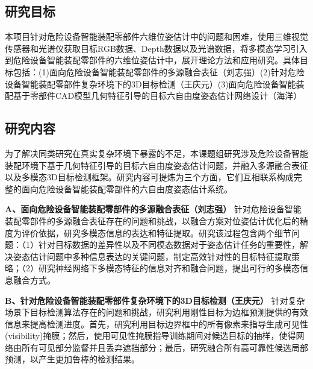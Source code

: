\documentclass[12pt]{article}
\begin{document}
\subsection{研究目标}
本项目针对危险设备智能装配零部件六维位姿估计中的问题和困难，使用三维视觉传感器和光谱仪获取目标RGB数据、Depth数据以及光谱数据，将多模态学习引入到危险设备智能装配零部件的六维位姿估计中，展开理论方法和应用研究。具体目标包括：(1)面向危险设备智能装配零部件的多源融合表征（刘志强）(2)针对危险设备智能装配零部件复杂环境下的3D目标检测（王庆元）(3)面向危险设备智能装配基于零部件CAD模型几何特征引导的目标六自由度姿态估计网络设计（海洋）



\subsection{研究内容}

为了解决同类研究在真实复杂环境下暴露的不足，本课题组研究涉及危险设备智能装配环境下基于几何特征引导的目标六自由度姿态估计问题，并融入多源融合表征以及多模态3D目标检测框架。研究内容可提炼为三个方面，它们互相联系构成完整的面向危险设备智能装配零部件的六自由度姿态估计系统。

\textbf{A、面向危险设备智能装配零部件的多源融合表征（刘志强）}
针对危险设备智能装配零部件的多源融合表征存在的问题和挑战，以融合方案对位姿估计优化后的精度为评价依据，研究多模态信息的表达和特征提取。研究该过程包含两个细节问题：（1）针对目标数据的差异性以及不同模态数据对于姿态估计任务的重要性，解决姿态估计问题中多种信息表达的关键问题，制定高效针对性的目标特征提取策略；（2）研究神经网络下多模态特征的信息对齐和融合问题，提出可行的多模态信息融合方式。

\textbf{B、针对危险设备智能装配零部件复杂环境下的3D目标检测（王庆元）}
针对复杂场景下目标检测算法存在的问题和挑战，研究利用刚性目标为边框预测提供的有效信息来提高检测进度。首先，研究利用目标边界框中的所有像素来指导生成可见性(visibility)掩膜；然后，使用可见性掩膜指导训练期间对候选目标的抽样，使得网络由所有可见部分监督并且丢弃遮挡部分；最后，研究融合所有高可靠性候选局部预测，以产生更加鲁棒的检测结果。
\end{document}
